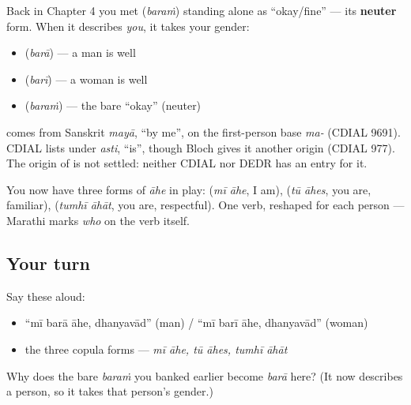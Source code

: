 Back in Chapter 4 you met \textbf{} (\emph{baraṁ}) standing alone as \textquotedblleft{}okay/fine\textquotedblright{} — its \textbf{neuter} form. When it describes \emph{you}, it takes your gender:

\begin{itemize}
\raggedright
  \item \textbf{} (\emph{barā}) — a man is well
  \item \textbf{} (\emph{barī}) — a woman is well
  \item \textbf{} (\emph{baraṁ}) — the bare \textquotedblleft{}okay\textquotedblright{} (neuter)
\end{itemize}

\begin{cousinweb}
\textbf{} comes from Sanskrit \emph{mayā}, \textquotedblleft{}by me\textquotedblright{}, on the first-person base \emph{ma-} (CDIAL 9691). \textbf{} CDIAL lists under \emph{asti}, \textquotedblleft{}is\textquotedblright{}, though Bloch gives it another origin (CDIAL 977). The origin of \textbf{} is not settled: neither CDIAL nor DEDR has an entry for it.
\end{cousinweb}

\begin{grammarlens}[title={Grammar Lens: the copula changes with the subject}]
You now have three forms of \emph{āhe} in play: \textbf{ } (\emph{mī āhe}, I am), \textbf{ } (\emph{tū āhes}, you are, familiar), \textbf{ } (\emph{tumhī āhāt}, you are, respectful). One verb, reshaped for each person — Marathi marks \emph{who} on the verb itself.
\end{grammarlens}

\subsection*{Your turn}
Say these aloud:

\begin{itemize}
\raggedright
  \item \textquotedblleft{}mī barā āhe, dhanyavād\textquotedblright{} (man) / \textquotedblleft{}mī barī āhe, dhanyavād\textquotedblright{} (woman)
  \item the three copula forms — \emph{mī āhe, tū āhes, tumhī āhāt}
\end{itemize}

\begin{tcolorbox}[breakable,colback=teal!4,colframe=teal!35!black,title={Before you move on}]
Why does the bare \emph{baraṁ} you banked earlier become \emph{barā} here? (It now describes a person, so it takes that person's gender.)
\end{tcolorbox}
